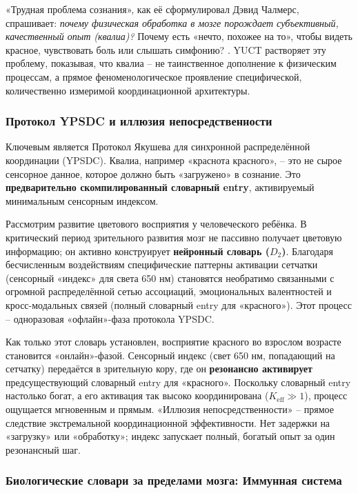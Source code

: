 \documentclass[12pt,a4paper]{article}
\begin{document}
	«Трудная проблема сознания», как её сформулировал Дэвид Чалмерс, спрашивает: \textit{почему физическая обработка в мозге порождает субъективный, качественный опыт (квалиа)?} Почему есть «нечто, похожее на то», чтобы видеть красное, чувствовать боль или слышать симфонию? \cite{Chalmers1995}. YUCT растворяет эту проблему, показывая, что квалиа – не таинственное дополнение к физическим процессам, а прямое феноменологическое проявление специфической, количественно измеримой координационной архитектуры.
	
	\subsubsection{Протокол YPSDC и иллюзия непосредственности}
	
	Ключевым является Протокол Якушева для синхронной распределённой координации (YPSDC). Квалиа, например «краснота красного», – это не сырое сенсорное данное, которое должно быть «загружено» в сознание. Это \textbf{предварительно скомпилированный словарный entry}, активируемый минимальным сенсорным индексом.
	
	Рассмотрим развитие цветового восприятия у человеческого ребёнка. В критический период зрительного развития мозг не пассивно получает цветовую информацию; он активно конструирует \textbf{нейронный словарь (\(D_2\))}. Благодаря бесчисленным воздействиям специфические паттерны активации сетчатки (сенсорный «индекс» для света 650 нм) становятся необратимо связанными с огромной распределённой сетью ассоциаций, эмоциональных валентностей и кросс-модальных связей (полный словарный entry для «красного»). Этот процесс – одноразовая «офлайн»-фаза протокола YPSDC.
	
	Как только этот словарь установлен, восприятие красного во взрослом возрасте становится «онлайн»-фазой. Сенсорный индекс (свет 650 нм, попадающий на сетчатку) передаётся в зрительную кору, где он \textbf{резонансно активирует} предсуществующий словарный entry для «красного». Поскольку словарный entry настолько богат, а его активация так высоко координирована (\(K_{\mathrm{eff}} \gg 1\)), процесс ощущается мгновенным и прямым. «Иллюзия непосредственности» – прямое следствие экстремальной координационной эффективности. Нет задержки на «загрузку» или «обработку»; индекс запускает полный, богатый опыт за один резонансный шаг.
	
	\subsubsection{Биологические словари за пределами мозга: Иммунная система}
	
\end{document}
